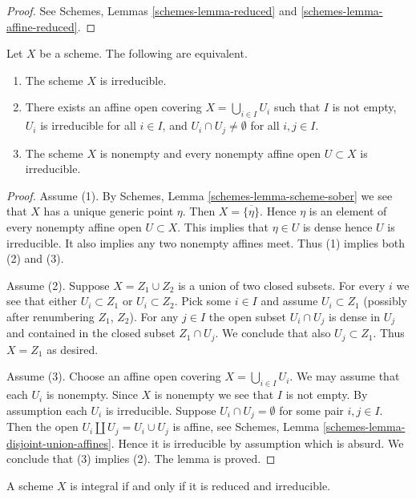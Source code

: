 \begin{proof}
See Schemes, Lemmas \ref{schemes-lemma-reduced} and
\ref{schemes-lemma-affine-reduced}.
\end{proof}

\begin{lemma}
\label{lemma-characterize-irreducible}
Let $X$ be a scheme.
The following are equivalent.
\begin{enumerate}
\item The scheme $X$ is irreducible.
\item There exists an affine open covering $X = \bigcup_{i \in I} U_i$
such that $I$ is not empty, $U_i$ is irreducible for all $i \in I$, and
$U_i \cap U_j \not = \emptyset$ for all $i, j \in I$.
\item The scheme $X$ is nonempty and every nonempty affine open
$U \subset X$ is irreducible.
\end{enumerate}
\end{lemma}

\begin{proof}
Assume (1). By Schemes, Lemma \ref{schemes-lemma-scheme-sober}
we see that $X$ has a unique generic point $\eta$. Then
$X = \overline{\{\eta\}}$. Hence $\eta$ is an element of
every nonempty affine open $U \subset X$. This implies
that $\eta \in U$ is dense hence $U$ is irreducible.
It also implies any two nonempty affines meet.
Thus (1) implies both (2) and (3).

\medskip\noindent
Assume (2). Suppose $X = Z_1 \cup Z_2$ is a union of two closed subsets.
For every $i$ we see that either $U_i \subset Z_1$ or $U_i \subset Z_2$.
Pick some $i \in I$ and assume $U_i \subset Z_1$ (possibly after renumbering
$Z_1$, $Z_2$). For any $j \in I$ the open subset $U_i \cap U_j$ is dense in
$U_j$ and contained in the closed subset $Z_1 \cap U_j$. We conclude that
also $U_j \subset Z_1$. Thus $X = Z_1$ as desired.

\medskip\noindent
Assume (3). Choose an affine open covering $X = \bigcup_{i \in I} U_i$.
We may assume that each $U_i$ is nonempty.
Since $X$ is nonempty we see that $I$ is not empty.
By assumption each $U_i$ is irreducible.
Suppose $U_i \cap U_j = \emptyset$ for some pair $i, j \in I$.
Then the open $U_i \amalg  U_j = U_i \cup U_j$ is affine, see
Schemes, Lemma \ref{schemes-lemma-disjoint-union-affines}.
Hence it is irreducible by assumption which is absurd. We conclude that (3)
implies (2). The lemma is proved.
\end{proof}

\begin{lemma}
\label{lemma-characterize-integral}
A scheme $X$ is integral if and only if it is reduced and irreducible.
\end{lemma}

